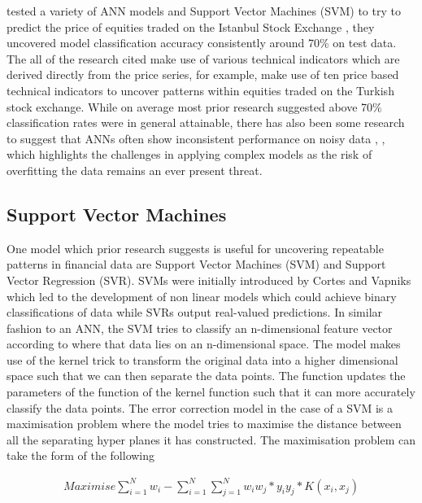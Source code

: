 \documentclass[12pt, a4paper]{article}
\begin{document}
 \cite{Gunduz2017} tested a variety of  ANN models and Support Vector Machines (SVM) to try to predict the price of equities traded on the Istanbul Stock Exchange , they uncovered model classification accuracy consistently around 70\% on test data. The all of the research cited make use of various technical indicators which are derived directly from the price series, for example,  
 \cite{Gunduz2017} make use of ten price based technical indicators to uncover patterns within equities traded on the Turkish stock exchange. While on average most prior research suggested above 70\% classification rates were in general attainable, there has also been some research to suggest that ANNs often show inconsistent performance on noisy data \cite{Kim2003}, \cite{Kumar2006} \cite{Kim2000} , which highlights the challenges in applying complex models as the risk of overfitting the data remains an ever present threat. 

\subsection{Support Vector Machines}
One model which prior research suggests is useful for uncovering repeatable patterns in financial data are Support Vector Machines (SVM) and Support Vector Regression (SVR). SVMs were initially introduced by Cortes and Vapniks \cite{Cortes1995} which led to the development of non linear models which could achieve binary classifications of data while SVRs output real-valued predictions. In similar fashion to an ANN, the SVM tries to classify an n-dimensional feature vector according to where that data lies on an n-dimensional space.
\newline The model makes use of the kernel trick \cite{kerneltrick} to transform the original data into a higher dimensional space such that we can then separate the data points. The function updates the parameters of the function of the kernel function such that it can more accurately classify the data points. The error correction model in the case of a SVM is a maximisation problem where the model tries to maximise the distance between all the separating hyper planes it has constructed.  The maximisation problem can take the form of the following

\begin{align}
Maximise  \sum^{N}_{i = 1}w_{i} - \sum^{N}_{i = 1} \sum^{N}_{j = 1}w_{i}w_{j}*y_{i}y_{j}*K(x_{i},x_{j}) 
\end{align}
\end{document}

